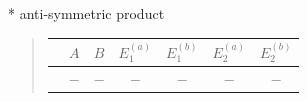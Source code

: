 \documentclass[fleqn,8pt,landscape]{jsarticle}
\begin{document}
* anti-symmetric product
\begin{quote}
\begin{tabular}{ccccccc} \hline \hline
 & $ A $ & $ B $ & $ E_{1}^{(a)} $ & $ E_{1}^{(b)} $ & $ E_{2}^{(a)} $ & $ E_{2}^{(b)} $ \\ \hline
$  $ & $ - $ & $ - $ & $ - $ & $ - $ & $ - $ & $ - $ \\
 \hline \hline
\end{tabular}
\end{quote}
\end{document}
